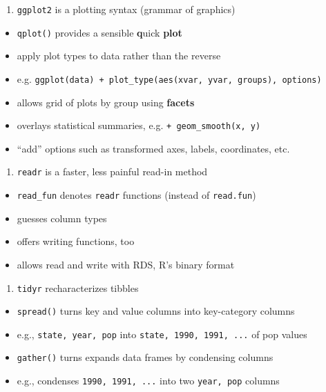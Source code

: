 \documentclass[]{book}
\providecommand{\tightlist}{%
  \setlength{\itemsep}{0pt}\setlength{\parskip}{0pt}}
\begin{document}
\begin{enumerate}
\def\labelenumi{\arabic{enumi}.}
\setcounter{enumi}{3}
\tightlist
\item
  \texttt{ggplot2} is a plotting syntax (grammar of graphics)
\end{enumerate}

\begin{itemize}
\tightlist
\item
  \texttt{qplot()} provides a sensible \textbf{q}uick \textbf{plot}
\item
  apply plot types to data rather than the reverse
\item
  e.g.
  \texttt{ggplot(data)\ +\ plot\_type(aes(xvar,\ yvar,\ groups),\ options)}
\item
  allows grid of plots by group using \textbf{facets}
\item
  overlays statistical summaries, e.g. \texttt{+\ geom\_smooth(x,\ y)}
\item
  ``add'' options such as transformed axes, labels, coordinates, etc.
\end{itemize}

\begin{enumerate}
\def\labelenumi{\arabic{enumi}.}
\setcounter{enumi}{4}
\tightlist
\item
  \texttt{readr} is a faster, less painful read-in method
\end{enumerate}

\begin{itemize}
\tightlist
\item
  \texttt{read\_fun} denotes \texttt{readr} functions (instead of
  \texttt{read.fun})
\item
  guesses column types
\item
  offers writing functions, too
\item
  allows read and write with RDS, R's binary format
\end{itemize}

\begin{enumerate}
\def\labelenumi{\arabic{enumi}.}
\setcounter{enumi}{5}
\tightlist
\item
  \texttt{tidyr} recharacterizes tibbles
\end{enumerate}

\begin{itemize}
\tightlist
\item
  \texttt{spread()} turns key and value columns into key-category
  columns
\item
  e.g., \texttt{state,\ year,\ pop} into
  \texttt{state,\ 1990,\ 1991,\ ...} of pop values
\item
  \texttt{gather()} turns expands data frames by condensing columns
\item
  e.g., condenses \texttt{1990,\ 1991,\ ...} into two
  \texttt{year,\ pop} columns
\end{itemize}
\end{document}
